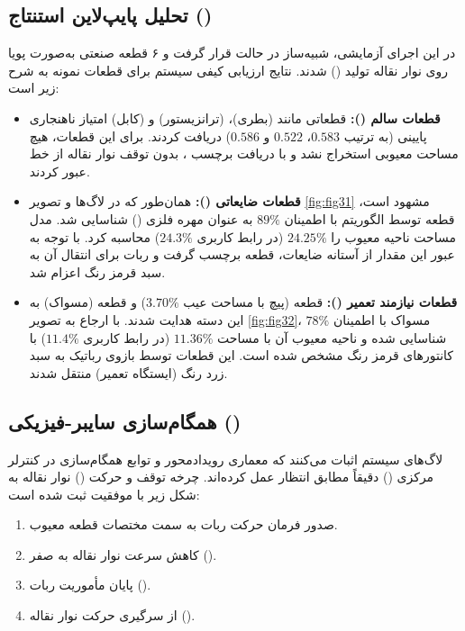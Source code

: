 \documentclass{article}
\begin{document}
\subsection{تحلیل پایپ‌لاین استنتاج ()}
در این اجرای آزمایشی، شبیه‌ساز در حالت  قرار گرفت و ۶ قطعه صنعتی به‌صورت پویا روی نوار نقاله تولید () شدند. نتایج ارزیابی کیفی سیستم برای قطعات نمونه به شرح زیر است:

\begin{itemize}
	\item \textbf{قطعات سالم ():} قطعاتی مانند  (بطری)،  (ترانزیستور) و  (کابل) امتیاز ناهنجاری پایینی (به ترتیب $0.583$، $0.522$ و $0.586$) دریافت کردند. برای این قطعات، هیچ مساحت معیوبی استخراج نشد و با دریافت برچسب ، بدون توقف نوار نقاله از خط عبور کردند.
	
	\item \textbf{قطعات ضایعاتی ():} همان‌طور که در لاگ‌ها و تصویر \ref{fig:fig31} مشهود است، قطعه  توسط الگوریتم  با اطمینان $89\%$ به عنوان مهره فلزی () شناسایی شد. مدل  مساحت ناحیه معیوب را \textbf{$24.25\%$} (در رابط کاربری $24.3\%$) محاسبه کرد. با توجه به عبور این مقدار از آستانه ضایعات، قطعه برچسب  گرفت و ربات برای انتقال آن به سبد قرمز رنگ اعزام شد.
	
	\item \textbf{قطعات نیازمند تعمیر ():} قطعه  (پیچ با مساحت عیب $3.70\%$) و قطعه  (مسواک) به این دسته هدایت شدند. با ارجاع به تصویر \ref{fig:fig32}، مسواک با اطمینان $78\%$ شناسایی شده و ناحیه معیوب آن با مساحت \textbf{$11.36\%$} (در رابط کاربری $11.4\%$) با کانتورهای قرمز رنگ مشخص شده است. این قطعات توسط بازوی رباتیک به سبد زرد رنگ (ایستگاه تعمیر) منتقل شدند.
\end{itemize}

\subsection{همگام‌سازی سایبر-فیزیکی ()}
لاگ‌های سیستم اثبات می‌کنند که معماری رویدادمحور و توابع همگام‌سازی در کنترلر مرکزی () دقیقاً مطابق انتظار عمل کرده‌اند. چرخه توقف و حرکت () نوار نقاله به شکل زیر با موفقیت ثبت شده است:

\begin{enumerate}
	\item صدور فرمان حرکت ربات به سمت مختصات قطعه معیوب.
	\item کاهش سرعت نوار نقاله به صفر ().
	\item پایان مأموریت ربات ().
	\item از سرگیری حرکت نوار نقاله ().
\end{enumerate}
\end{document}
